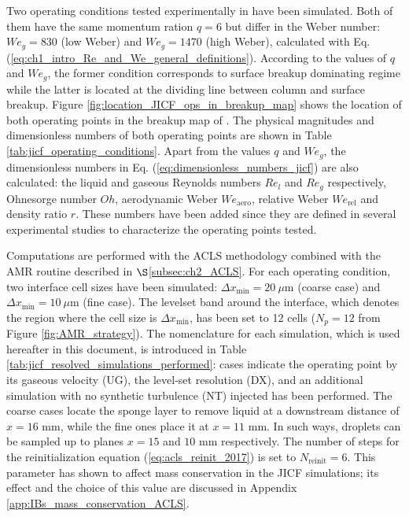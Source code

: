 Two operating conditions tested experimentally in  have been simulated. Both of them have the same momentum ration $q = 6$ but differ in the Weber number: $We_g = 830$ (low Weber) and $We_g = 1470$ (high Weber), calculated with Eq. (\ref{eq:ch1_intro_Re_and_We_general_definitions}). According to the values of $q$ and $We_g$, the former condition corresponds to surface breakup dominating regime while the latter is located at the dividing line between column and surface breakup. Figure \ref{fig:location_JICF_ops_in_breakup_map} shows the location of both operating points in the breakup map of \citeColor[wu_breakup_1997]. The physical magnitudes and dimensionless numbers of both operating points are shown in Table \ref{tab:jicf_operating_conditions}. Apart from the values $q$ and $We_g$, the dimensionless numbers in  Eq. (\ref{eq:dimensionless_numbers_jicf}) are also calculated: the liquid and gaseous Reynolds numbers $Re_l$ and $Re_g$ respectively, Ohnesorge number $Oh$, aerodynamic Weber $We_\mathrm{aero}$, relative Weber $We_\mathrm{rel}$ and density ratio $r$. These numbers have been added since they are defined in several experimental studies  to characterize the operating points tested. 

Computations are performed with the ACLS methodology combined with the AMR routine described in $\S$\ref{subsec:ch2_ACLS}. For each operating condition, two interface cell sizes have been simulated: $\Delta x_\mathrm{min} = 20 ~\mu$m (coarse case) and $\Delta x_\mathrm{min} = 10 ~\mu$m (fine case). The levelset band around the interface, which denotes the region where the cell size is $\Delta x_\mathrm{min}$, has been set to 12 cells ($N_p = 12$ from Figure \ref{fig:AMR_strategy}). The nomenclature for each simulation, which is used hereafter in this document, is introduced in Table \ref{tab:jicf_resolved_simulations_performed}: cases indicate the operating point by its gaseous velocity (UG), the level-set resolution (DX), and an additional simulation with no synthetic turbulence (NT) injected has been performed.  The coarse cases locate the sponge layer to remove liquid at a downstream distance of $x = 16$ mm, while the fine ones place it at $x = 11$ mm. In such ways, droplets can be sampled up to planes $x = 15$ and $10$ mm respectively. The number of steps for the reinitialization equation (\ref{eq:acls_reinit_2017}) is set to $N_\mathrm{reinit} = 6$. This parameter has shown to affect mass conservation in the JICF simulations; its effect and the choice of this value are discussed in Appendix \ref{app:IBs_mass_conservation_ACLS}.


